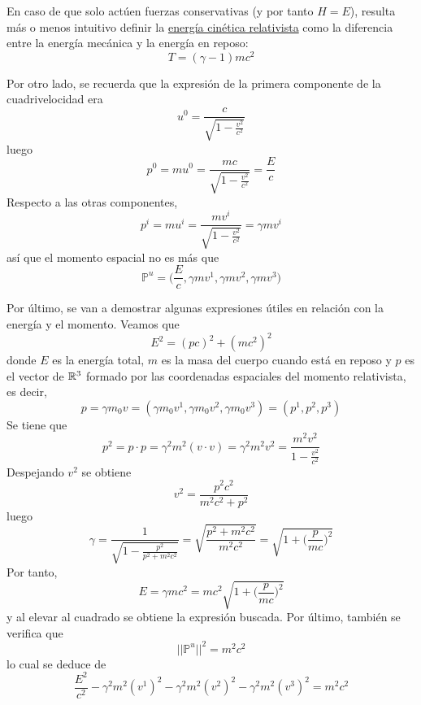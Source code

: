 \documentclass[12pt]{report}
\begin{document}
\vspace{2mm}
En caso de que solo actúen fuerzas conservativas (y por tanto $H = E$), resulta más o menos intuitivo definir la \ul{energía cinética relativista} como la diferencia entre la energía mecánica y la energía en reposo:
\[\boxed{T = (\gamma-1)mc^2}\]

\vspace{2mm}
Por otro lado, se recuerda que la expresión de la primera componente de la cuadrivelocidad era
\[u^0 = \frac{c}{\sqrt{1-\frac{v^2}{c^2}}}\]
luego
\[p^0 = mu^0 = \frac{mc}{\sqrt{1-\frac{v^2}{c^2}}} = \frac{E}{c}\]
Respecto a las otras componentes,
\[p^i = mu^i = \frac{mv^i}{\sqrt{1-\frac{v^2}{c^2}}} = \gamma mv^i\]
así que el momento espacial no es más que
\[\boxed{\mathbb{P}^u = \biggl(\frac{E}{c}, \gamma m v^1, \gamma m v^2,  \gamma m v^3 \biggr)}\]

\vspace{2mm}
Por último, se van a demostrar algunas expresiones útiles en relación con la energía y el momento. Veamos que
\[\boxed{E^2 = (pc)^2+(mc^2)^2}\]
donde $E$ es la energía total, $m$ es la masa del cuerpo cuando está en reposo y $p$ es el vector de $\mathbb R^3$ formado por las coordenadas espaciales del momento relativista, es decir, \[p = \gamma m_0 v = (\gamma m_0 v^1, \gamma m_0 v^2, \gamma m_0 v^3) = (p^1,p^2,p^3)\]
Se tiene que
\[p^2 = p \cdot p = \gamma^2 m^2 (v \cdot v) = \gamma^2 m^2 v^2 = \frac{m^2v^2}{1-\frac{v^2}{c^2}}\]
Despejando $v^2$ se obtiene
\[v^2 = \frac{p^2c^2}{m^2c^2+p^2}\]
luego
\[\gamma = \frac{1}{\sqrt{1-\frac{p^2}{p^2+m^2c^2}}} = \sqrt{\frac{p^2+m^2c^2}{m^2c^2}} = \sqrt{1+\biggl(\frac{p}{mc}\biggr)^2}\]
Por tanto,
\[E = \gamma m c^2 = mc^2\sqrt{1+\biggl(\frac{p}{mc}\biggr)^2}\]
y al elevar al cuadrado se obtiene la expresión buscada. Por último, también se verifica que
\[\boxed{||\mathbb{P}^u||^2 = m^2c^2}\]
lo cual se deduce de
\[\frac{E^2}{c^2}-\gamma^2m^2(v^1)^2-\gamma^2m^2(v^2)^2-\gamma^2m^2(v^3)^2 = m^2c^2\]
\end{document}
